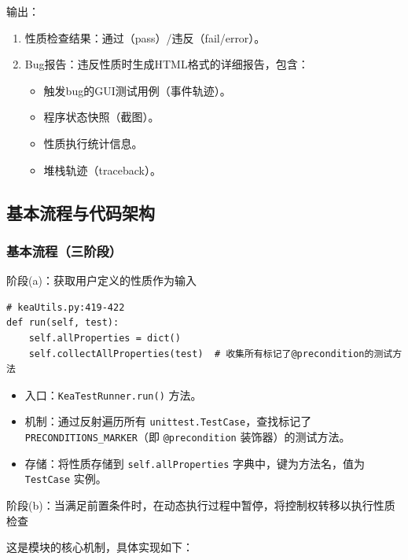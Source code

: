 \documentclass[a4paper, zihao=-4]{ctexart}
\newcommand{\bff}[1]{{\heiti #1}}
\begin{document}
\bff{输出}：
\begin{enumerate}
    \item \bff{性质检查结果}：通过（pass）/违反（fail/error）。
    \item \bff{Bug报告}：违反性质时生成HTML格式的详细报告，包含：
    \begin{itemize}
        \item 触发bug的GUI测试用例（事件轨迹）。
        \item 程序状态快照（截图）。
        \item 性质执行统计信息。
        \item 堆栈轨迹（traceback）。
    \end{itemize}
\end{enumerate}

\subsection{基本流程与代码架构}

\subsubsection{基本流程（三阶段）}

\bff{阶段(a)：获取用户定义的性质作为输入}

\begin{lstlisting}
# keaUtils.py:419-422
def run(self, test):
    self.allProperties = dict()
    self.collectAllProperties(test)  # 收集所有标记了@precondition的测试方法
\end{lstlisting}

\begin{itemize}
    \item \bff{入口}：\texttt{KeaTestRunner.run()} 方法。
    \item \bff{机制}：通过反射遍历所有 \texttt{unittest.TestCase}，查找标记了 \texttt{PRECONDITIONS\_MARKER}（即 \texttt{@precondition} 装饰器）的测试方法。
    \item \bff{存储}：将性质存储到 \texttt{self.allProperties} 字典中，键为方法名，值为 \texttt{TestCase} 实例。
\end{itemize}

\bff{阶段(b)：当满足前置条件时，在动态执行过程中暂停，将控制权转移以执行性质检查}

这是模块的核心机制，具体实现如下：
\end{document}
